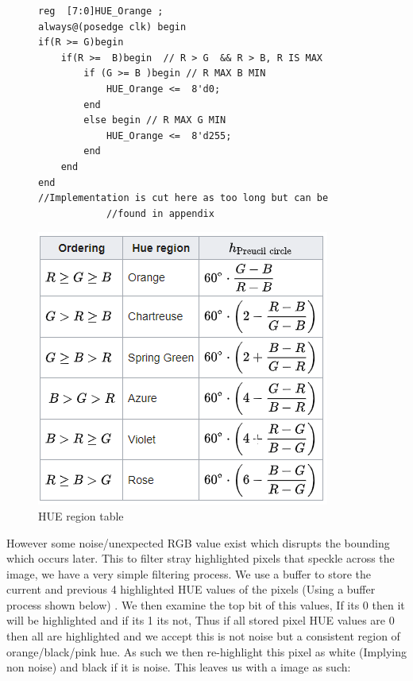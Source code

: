\documentclass[10pt,twoside]{article}
\begin{document}
\begin{figure}[hbt]
\begin{minipage}{.54\textwidth}
\begin{verbatim}
reg  [7:0]HUE_Orange ; 
always@(posedge clk) begin
if(R >= G)begin 
	if(R >=  B)begin  // R > G  && R > B, R IS MAX
		if (G >= B )begin // R MAX B MIN
			HUE_Orange <=  8'd0; 
		end 
		else begin // R MAX G MIN
			HUE_Orange <=  8'd255; 
		end
	end
end
//Implementation is cut here as too long but can be 
            //found in appendix
\end{verbatim}
\end{minipage}
\begin{minipage}{.45\textwidth}
            \includegraphics[scale = 0.4]{HueRegions.PNG}
            \centering
            \caption{HUE region table \cite{HueWikipedia}}
            \label{fig:InitalDesign}
\end{minipage}
\end{figure}

However some noise/unexpected RGB value exist which disrupts the bounding which occurs later. This to filter stray highlighted pixels that speckle across the image, we have a very simple filtering process. We use a buffer to store the current and previous 4 highlighted HUE values of the pixels (Using a buffer process shown below) . We then examine the top bit of this values, If its 0 then it will be highlighted and if its 1 its not, Thus if all stored pixel HUE values are 0 then all are highlighted and we accept this is not noise but a consistent region of orange/black/pink hue. As such we then re-highlight this pixel as white (Implying non noise) and black if it is noise. This leaves us with a image as such:
\end{document}
